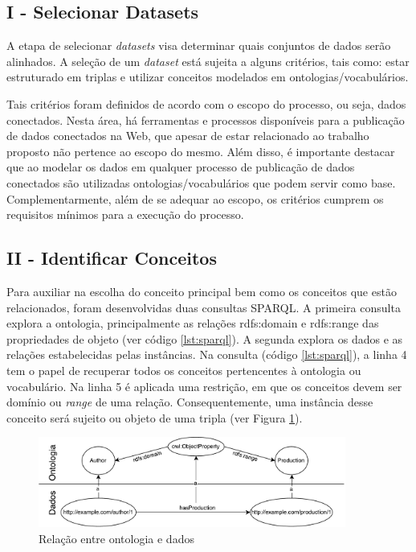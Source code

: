\subsection{I - Selecionar Datasets}
A etapa de selecionar \textit{datasets} visa determinar quais conjuntos de dados serão alinhados. A seleção de um \textit{dataset} está sujeita a alguns critérios, tais como: estar estruturado em triplas e utilizar conceitos modelados em ontologias/vocabulários. 

Tais critérios foram definidos de acordo com o escopo do processo, ou seja, dados conectados. Nesta área, há ferramentas e processos disponíveis para a publicação de dados conectados na Web, que apesar de estar relacionado ao trabalho proposto não pertence ao escopo do mesmo. Além disso, é importante destacar que ao modelar os dados em qualquer processo de publicação de dados conectados são utilizadas ontologias/vocabulários que podem servir como base. Complementarmente, além de se adequar ao escopo, os critérios cumprem os requisitos mínimos para a execução do processo. 

\subsection{II - Identificar Conceitos}
\label{sec:prop_identificar}
Para auxiliar na escolha do conceito principal bem como os conceitos que estão relacionados, foram desenvolvidas duas consultas SPARQL. A primeira consulta explora a ontologia, principalmente as relações rdfs:domain e rdfs:range das propriedades de objeto (ver código \ref{lst:sparql}). A segunda explora os dados e as relações estabelecidas pelas instâncias.
Na consulta (código \ref{lst:sparql}), a linha 4 tem o papel de recuperar todos os conceitos pertencentes à ontologia ou vocabulário. Na linha 5 é aplicada uma restrição, em que os conceitos devem ser domínio ou \textit{range} de uma relação. Consequentemente, uma instância desse conceito será sujeito ou objeto de uma tripla (ver Figura \ref{fig:subgrafo}).
% 
% 
%
%
\begin{figure}[!h]
	\centering
	\includegraphics[width=0.9\textwidth]{./imagens/subgrafo_semantico.pdf}
	\caption{Relação entre ontologia e dados}
	\label{fig:subgrafo}
\end{figure}

